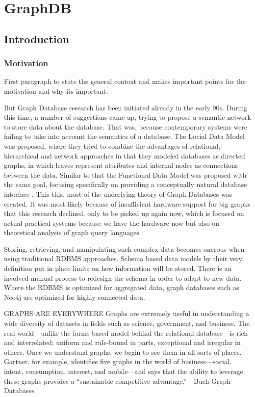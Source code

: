 \chapter{GraphDB}

\section{Introduction}
\subsection{Motivation}
First paragraph to state the general context and makes important points for the motivation and why its important.

But Graph Database research has been initiated already in the early 90s. During this time, a number of suggestions came up, trying to  propose a semantic network to store data about the database. That was, because contemporary systems were failing to take into account the semantics of a database.
The Locial Data Model \cite{KUPERLDM} was proposed, where they tried to combine the advantages of relational, hierarchical and network approaches in that they modeled databases as directed graphs, in which leaves represent attributes and internal nodes as connections between the data.
Similar to that the Functional Data Model \cite{Shipman1979} was proposed with the same goal, focusing specifically on providing a conceptually natural database interface \cite{Angles2018AnIT}.
This this, most of the underlying theory of Graph Databases was created.
It was most likely because of insufficient hardware support for big graphs that this research declined, only to be picked up again now, which is focused on actual practical systems because we have the hardware now but also on theoretical analysis of graph query languages. \cite{Angles2018AnIT}


Storing, retrieving, and
manipulating such complex data becomes onerous when using traditional RDBMS approaches. Schema based data models by
their very definition put in place limits on how information will be stored. There is an involved manual process to redesign
the schema in order to adapt to new data. Where the RDBMS is optimized for aggregated data, graph databases such as
Neo4j are optimized for highly connected data.

GRAPHS ARE EVERYWHERE
Graphs are extremely useful in understanding a wide diversity of datasets in fields such as science, government, and business. The real world—unlike the forms-based model behind the relational database—is rich and interrelated: uniform and rule-bound in parts, exceptional and irregular in others. Once we understand graphs, we begin to see them in all sorts of places. Gartner, for example, identifies five graphs in the world of business—social, intent, consumption, interest, and mobile—and says that the ability to leverage these graphs provides a “sustainable competitive advantage.”
- Buch Graph Databases 

